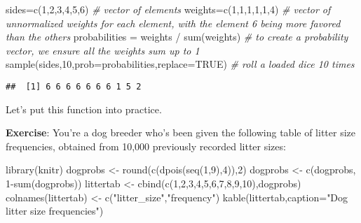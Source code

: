 \documentclass[
]{book}
\newenvironment{Shaded}{\begin{snugshade}}{\end{snugshade}}
\newcommand{\AttributeTok}[1]{\textcolor[rgb]{0.77,0.63,0.00}{#1}}
\newcommand{\CommentTok}[1]{\textcolor[rgb]{0.56,0.35,0.01}{\textit{#1}}}
\newcommand{\ConstantTok}[1]{\textcolor[rgb]{0.00,0.00,0.00}{#1}}
\newcommand{\DecValTok}[1]{\textcolor[rgb]{0.00,0.00,0.81}{#1}}
\newcommand{\FunctionTok}[1]{\textcolor[rgb]{0.00,0.00,0.00}{#1}}
\newcommand{\NormalTok}[1]{#1}
\newcommand{\OtherTok}[1]{\textcolor[rgb]{0.56,0.35,0.01}{#1}}
\newcommand{\SpecialCharTok}[1]{\textcolor[rgb]{0.00,0.00,0.00}{#1}}
\newcommand{\StringTok}[1]{\textcolor[rgb]{0.31,0.60,0.02}{#1}}
\begin{document}
\begin{Shaded}
\begin{Highlighting}[]
\NormalTok{sides}\OtherTok{=}\FunctionTok{c}\NormalTok{(}\DecValTok{1}\NormalTok{,}\DecValTok{2}\NormalTok{,}\DecValTok{3}\NormalTok{,}\DecValTok{4}\NormalTok{,}\DecValTok{5}\NormalTok{,}\DecValTok{6}\NormalTok{) }\CommentTok{\# vector of elements}
\NormalTok{weights}\OtherTok{=}\FunctionTok{c}\NormalTok{(}\DecValTok{1}\NormalTok{,}\DecValTok{1}\NormalTok{,}\DecValTok{1}\NormalTok{,}\DecValTok{1}\NormalTok{,}\DecValTok{1}\NormalTok{,}\DecValTok{4}\NormalTok{) }\CommentTok{\# vector of unnormalized weights for each element, with the element \textquotesingle{}6\textquotesingle{} being more favored than the others}
\NormalTok{probabilities }\OtherTok{=}\NormalTok{ weights }\SpecialCharTok{/} \FunctionTok{sum}\NormalTok{(weights) }\CommentTok{\# to create a probability vector, we ensure all the weights sum up to 1}
\FunctionTok{sample}\NormalTok{(sides,}\DecValTok{10}\NormalTok{,}\AttributeTok{prob=}\NormalTok{probabilities,}\AttributeTok{replace=}\ConstantTok{TRUE}\NormalTok{) }\CommentTok{\# roll a loaded dice 10 times}
\end{Highlighting}
\end{Shaded}

\begin{verbatim}
##  [1] 6 6 6 6 6 6 6 1 5 2
\end{verbatim}

Let's put this function into practice.

\textbf{Exercise}: You're a dog breeder who's been given the following table of litter size frequencies, obtained from 10,000 previously recorded litter sizes:

\begin{Shaded}
\begin{Highlighting}[]
\FunctionTok{library}\NormalTok{(knitr)}
\NormalTok{dogprobs }\OtherTok{\textless{}{-}} \FunctionTok{round}\NormalTok{(}\FunctionTok{c}\NormalTok{(}\FunctionTok{dpois}\NormalTok{(}\FunctionTok{seq}\NormalTok{(}\DecValTok{1}\NormalTok{,}\DecValTok{9}\NormalTok{),}\DecValTok{4}\NormalTok{)),}\DecValTok{2}\NormalTok{)}
\NormalTok{dogprobs }\OtherTok{\textless{}{-}} \FunctionTok{c}\NormalTok{(dogprobs, }\DecValTok{1}\SpecialCharTok{{-}}\FunctionTok{sum}\NormalTok{(dogprobs))}
\NormalTok{littertab }\OtherTok{\textless{}{-}} \FunctionTok{cbind}\NormalTok{(}\FunctionTok{c}\NormalTok{(}\DecValTok{1}\NormalTok{,}\DecValTok{2}\NormalTok{,}\DecValTok{3}\NormalTok{,}\DecValTok{4}\NormalTok{,}\DecValTok{5}\NormalTok{,}\DecValTok{6}\NormalTok{,}\DecValTok{7}\NormalTok{,}\DecValTok{8}\NormalTok{,}\DecValTok{9}\NormalTok{,}\DecValTok{10}\NormalTok{),dogprobs)}
\FunctionTok{colnames}\NormalTok{(littertab) }\OtherTok{\textless{}{-}} \FunctionTok{c}\NormalTok{(}\StringTok{"litter\_size"}\NormalTok{,}\StringTok{"frequency"}\NormalTok{)}
\FunctionTok{kable}\NormalTok{(littertab,}\AttributeTok{caption=}\StringTok{"Dog litter size frequencies"}\NormalTok{)}
\end{Highlighting}
\end{Shaded}
\end{document}
